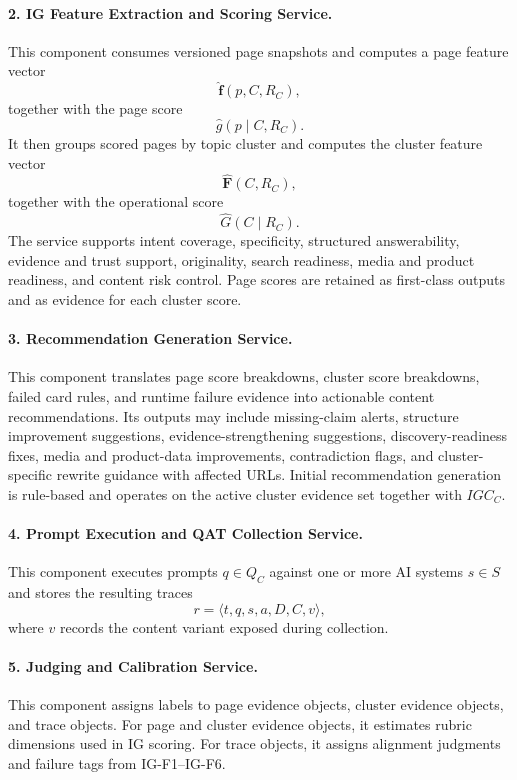 \documentclass{article}
\begin{document}
\paragraph{2. IG Feature Extraction and Scoring Service.}
This component consumes versioned page snapshots and computes a page feature vector
\[
\hat{\mathbf{f}}(p,C,R_C),
\]
together with the page score
\[
\hat{g}(p \mid C,R_C).
\]
It then groups scored pages by topic cluster and computes the cluster feature vector
\[
\hat{\mathbf{F}}(C,R_C),
\]
together with the operational score
\[
\hat{G}(C \mid R_C).
\]
The service supports intent coverage, specificity, structured answerability, evidence and trust support, originality, search readiness, media and product readiness, and content risk control. Page scores are retained as first-class outputs and as evidence for each cluster score.

\paragraph{3. Recommendation Generation Service.}
This component translates page score breakdowns, cluster score breakdowns, failed card rules, and runtime failure evidence into actionable content recommendations. Its outputs may include missing-claim alerts, structure improvement suggestions, evidence-strengthening suggestions, discovery-readiness fixes, media and product-data improvements, contradiction flags, and cluster-specific rewrite guidance with affected URLs. Initial recommendation generation is rule-based and operates on the active cluster evidence set together with \(IGC_C\).

\paragraph{4. Prompt Execution and QAT Collection Service.}
This component executes prompts \(q \in Q_C\) against one or more AI systems \(s \in S\) and stores the resulting traces
\[
r = \langle t, q, s, a, D, C, v \rangle,
\]
where \(v\) records the content variant exposed during collection.

\paragraph{5. Judging and Calibration Service.}
This component assigns labels to page evidence objects, cluster evidence objects, and trace objects. For page and cluster evidence objects, it estimates rubric dimensions used in IG scoring. For trace objects, it assigns alignment judgments and failure tags from IG-F1--IG-F6.
\end{document}
